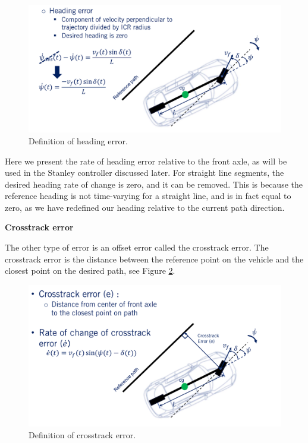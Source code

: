 \begin{figure}[!htb]
\begin{center}
\includegraphics[scale=0.280]{img/lateral_control/heading_error_def.jpeg}
\end{center}
\caption{Definition of heading error.}
\label{heading_error_def}
\end{figure}

Here we present the rate of heading error relative to the front axle, as will be used in the Stanley controller discussed later. For straight line segments, the desired heading rate
of change is zero, and it can be removed. This is because the reference heading is not time-varying for a straight line, and is in fact equal to zero, 
as we have redefined our heading relative to the current path direction. 

\textbf{Crosstrack error}

The other type of error is an offset error called
the crosstrack error. The crosstrack error is the distance between
the reference point on the vehicle and the closest point
on the desired path, see Figure \ref{crosstrack_error_def}. 

\begin{figure}[!htb]
\begin{center}
\includegraphics[scale=0.280]{img/lateral_control/crosstrack_error_def.jpeg}
\end{center}
\caption{Definition of crosstrack error.}
\label{crosstrack_error_def}
\end{figure}

